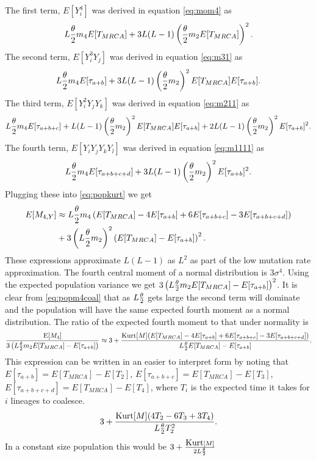 The first term, $E[Y_i^4]$ was derived in equation \eqref{eq:mom4} as
\begin{equation*}
  L\frac{\theta}{2} m_4 E[T_{MRCA}] + 3L(L-1)\left( \frac{\theta}{2} m_2 E[T_{MRCA}] \right)^2.
\end{equation*}
The second term, $E[Y_i^3Y_j]$ was derived in equation \eqref{eq:m31} as
\begin{equation*}
  L \frac{\theta}{2} m_4 E[\tau_{a+b}] + 3L(L-1) \left(\frac{\theta}{2} m_2\right)^2 E[T_{MRCA}]E[\tau_{a+b}].
\end{equation*}
The third term, $E[Y_i^2Y_jY_k]$ was derived in equation \eqref{eq:m211} as
\begin{equation*}
  L \frac{\theta}{2} m_4 E[\tau_{a+b+c}] + L(L-1)\left(\frac{\theta}{2} m_2\right)^2E[T_{MRCA}]E[\tau_{a+b}] +
  2L(L-1) \left(\frac{\theta}{2} m_2\right)^2E[\tau_{a+b}]^2.
\end{equation*}
The fourth term, $E[Y_iY_jY_kY_l]$ was derived in equation \eqref{eq:m1111} as
\begin{equation*}
  L \frac{\theta}{2} m_4 E[\tau_{a+b+c+d}] + 3L(L-1)\left(\frac{\theta}{2} m_2\right)^2E[\tau_{a+b}]^2.
\end{equation*}
Plugging these into \eqref{eq:popkurt} we get
\begin{align}
  \label{eq:popm4coal}
  E[M_{4,Y}] &\approx L \frac{\theta}{2} m_4 \left( E[T_{MRCA}] - 4E[\tau_{a+b}] +
  6E[\tau_{a+b+c}] -3E[\tau_{a+b+c+d}] \right)\nonumber \\ &+ 3\left( L \frac{\theta}{2} m_2
  \right)^2\left(E[T_{MRCA}]- E[\tau_{a+b}]\right)^2.
\end{align}
These expressions approximate $L(L-1)$ as $L^2$ as part of the low mutation rate
approximation. The fourth central moment of a normal distribution is
$3\sigma^4$. Using the expected population variance we get $3\left(L\frac{\theta}{2} m_2
E[T_{MRCA}]- E[\tau_{a+b}]\right)^2$. It is clear from \eqref{eq:popm4coal} that
as $L\frac{\theta}{2}$ gets large the second term will dominate and the population will have
the same expected fourth moment as a normal distribution. The ratio of the
expected fourth moment to that under normality is
\begin{equation*}
  \frac{\mathrm{E}[M_4]}{3\left(L\frac{\theta}{2} m_2 E[T_{MRCA}]- E[\tau_{a+b}]\right)} \approx 3 +
  \frac{\mbox{Kurt}[M]( E[T_{MRCA}] - 4E[\tau_{a+b}] + 6E[\tau_{a+b+c}]
    -3E[\tau_{a+b+c+d}])}{L \frac{\theta}{2} E[T_{MRCA}]- E[\tau_{a+b}]}.
\end{equation*}
This expression can be written in an easier to interpret form by noting that
$E[\tau_{a+b}]=E[T_{MRCA}] - E[T_2]$, $E[\tau_{a+b+c}]=E[T_{MRCA}] - E[T_3]$,
$E[\tau_{a+b+c+d}]=E[T_{MRCA}] - E[T_4]$, where $T_i$ is the expected time it
takes for $i$ lineages to coalesce.
\begin{equation}
  \label{eq:popkurtcoal}
  3 + \frac{\mbox{Kurt}[M]( 4T_2 - 6T_3 + 3T_4)}{L \frac{\theta}{2} T_2^2}.
\end{equation}
In a constant size population this would be $3 + \frac{\mbox{Kurt}[M]}{2L\frac{\theta}{2}}$

